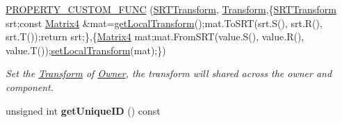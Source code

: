 \begin{DoxyCompactItemize}
\hyperlink{class_magnum_1_1_component_1_1_owner_a534bf399acb1fe6c2756aab7fc49d973}{P\+R\+O\+P\+E\+R\+T\+Y\+\_\+\+C\+U\+S\+T\+O\+M\+\_\+\+F\+U\+NC} (\hyperlink{class_magnum_1_1_s_r_t_transform}{S\+R\+T\+Transform}, \hyperlink{class_magnum_1_1_transform}{Transform},\{\hyperlink{class_magnum_1_1_s_r_t_transform}{S\+R\+T\+Transform} srt;const \hyperlink{class_magnum_1_1_matrix4}{Matrix4} \&mat=\hyperlink{class_magnum_1_1_frame3_a024b5f957cbb324a48e16b264d960410}{get\+Local\+Transform}();mat.\+To\+S\+RT(srt.\+S(), srt.\+R(), srt.\+T());return srt;\},\{\hyperlink{class_magnum_1_1_matrix4}{Matrix4} mat;mat.\+From\+S\+RT(value.\+S(), value.\+R(), value.\+T());\hyperlink{class_magnum_1_1_frame3_a83afcd522b770d9f91539a5edd120b71}{set\+Local\+Transform}(mat);\})
\begin{DoxyCompactList}\small\item\em Set the \hyperlink{class_magnum_1_1_transform}{Transform} of \hyperlink{class_magnum_1_1_component_1_1_owner}{Owner}, the transform will shared across the owner and component. \end{DoxyCompactList}\item 
unsigned int {\bfseries get\+Unique\+ID} () const \hypertarget{class_magnum_1_1_component_1_1_owner_a369116f1f6c84117e76a5237376c2f59}{}\label{class_magnum_1_1_component_1_1_owner_a369116f1f6c84117e76a5237376c2f59}


\end{DoxyCompactItemize}
